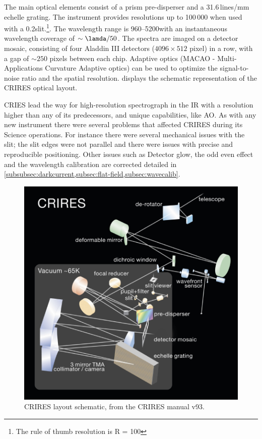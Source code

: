 The main optical elements consist of a prism pre-disperser and a 31.6\,lines/mm echelle grating. The instrument provides resolutions up to 100\,000 when used with a 0.2\arcsec slit.\footnote{The rule of thumb resolution is R = 100\times{}}. The wavelength range is 960--5200\nm with an instantaneous wavelength coverage of \(\sim \lamda/50\). The spectra are imaged on a detector mosaic, consisting of four Aladdin III detectors (\(4096 \times 512\) pixel) in a row, with a gap of \(\sim 250\) pixels between each chip. Adaptive optics (MACAO - Multi-Applications Curvature Adaptive optics) can be used to optimize the signal-to-noise ratio and the spatial resolution.  displays the schematic representation of the CRIRES optical layout.

CRIES lead the way for high-resolution spectrograph in the IR with a resolution higher than any of its predecessors, and unique capabilities, like AO. As with any new instrument there were several problems that affected CRIRES during its Science operations. For instance there were several mechanical issues with the slit; the slit edges were not parallel and there were issues with precise and reproducible positioning. Other issues such as Detector glow, the odd even effect and the wavelength calibration are corrected detailed in \cref{subsubsec:darkcurrent,subsec:flat-field,subsec:wavecalib}.


\begin{figure}
    \centering
    \includegraphics[width=0.7\linewidth]{figures/advanced_material/CRIRES_schematic}
    \caption{CRIRES layout schematic, from the CRIRES manual v93.}
    \label{fig:criresschematic}
\end{figure}

